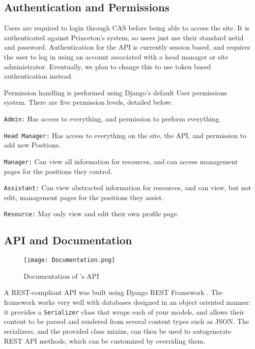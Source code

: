 \subsection{Authentication and Permissions}

Users are required to login through CAS before being able to access the site. It is authenticated against Princeton's system, so users just use their standard netid and password. Authentication for the API is currently session based, and requires the user to log in using an account associated with a head manager or site administrator. Eventually, we plan to change this to use token based authentication instead.

Permission handling is performed using Django's default User permissions system. There are five permission levels, detailed below:
\bullist
    \item \texttt{Admin:} Has access to everything, and permission to perform everything.
    \item \texttt{Head Manager:} Has access to everything on the site, the API, and permission to add new Positions.
    \item \texttt{Manager:} Can view all information for resources, and can access management pages for the positions they control.
    \item \texttt{Assistant:} Can view abstracted information for resources, and can view, but not edit, management pages for the positions they assist.
    \item \texttt{Resource:} May only view and edit their own profile page.
\finbullist

\subsection{API and Documentation}

\begin{figure}[!htbp]
    \centering
    \texttt{[image: Documentation.png]}
    \caption{Documentation of \tigeruhr{}'s API}
    \label{fig:documentation}
\end{figure}

A REST-compliant API was built using Django REST Framework \cite{django-rest-framework}. The framework works very well with databases designed in an object oriented manner: it provides a \texttt{Serializer} class that wraps each of your models, and allows their content to be parsed and rendered from several content types such as JSON. The serializers, and the provided class mixins, can then be used to autogenerate REST API methods, which can be customized by overriding them.

